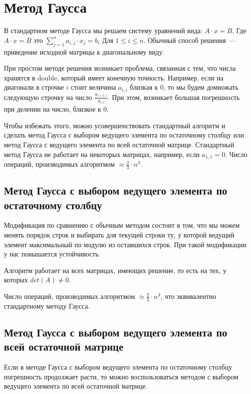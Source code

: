 \documentclass[../../report.tex]{subfiles}
\begin{document}


\chapter{Метод Гаусса}

В стандартном методе Гаусса мы решаем систему уравнений вида: $A \cdot x = B$.
Где $A \cdot x = B$ это
$\sum \limits_{j = 1}^{n} a_{i,j} \cdot x_j = b_i$ Для $1 \le i \le n$.
Обычный способ решения~--- приведение исходной матрицы к диагональному виду.

При простом методе решения возникает проблема, связанная с тем, что числа хранятся в double, который имеет конечную точность. Например, если на диагонали в строчке $i$ стоит величина $a_{i,i}$ близкая к $0$, то мы будем домножать следующую строчку на число $\frac{a_{i+1,i}}{a_{i,i}}$. При этом, возникает большая погрешность при делении на число, близкое к $0$.

Чтобы избежать этого, можно усовершенствовать стандартный алгоритм и сделать метод Гаусса с выбором ведущего элемента по остаточному столбцу или метод Гаусса с ведущего элемента по всей остаточной матрице.
Стандартный метод Гаусса не работает на некоторых матрицах, например, если $a_{1,1} = 0$.
Число операций, производимых алгоритмом $\approx \frac{2}{3} \cdot n^3$.

\section{Метод Гаусса с выбором ведущего элемента по остаточному столбцу}
Модификация по сравнению с обычным методом состоит в том, что мы можем менять порядок строк и выбирать для текущей строки ту, у которой ведущий элемент максимальный по модулю из оставшихся строк.
При такой модификации у нас повышается устойчивость.

Алгоритм работает на всех матрицах, имеющих решение, то есть на тех, у которых $det(A) \neq 0$.

Число операций, производимых алгоритмом $\approx \frac{2}{3} \cdot n^3$, что эквивалентно стандартному методу Гаусса.

\section{Метод Гаусса с выбором ведущего элемента по всей остаточной матрице}
Если в методе Гаусса с выбором ведущего элемента по остаточному столбцу погрешность продолжает расти, то можно воспользоваться методом с выбором ведущего элемента по всей остаточной матрице.
\end{document}
